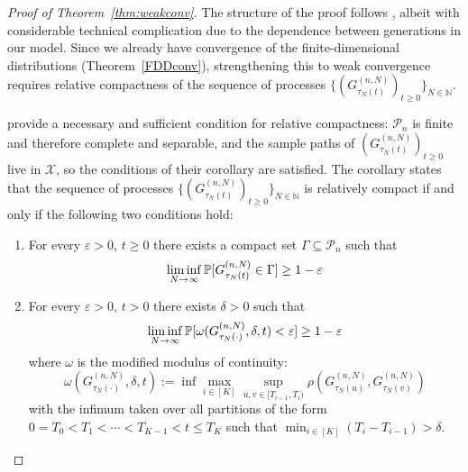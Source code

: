 \begin{proof}[Proof of Theorem~\ref{thm:weakconv}]
The structure of the proof follows \textcite{mohle1999}, albeit with considerable technical complication due to the dependence between generations in our model. 
Since we already have convergence of the finite-dimensional distributions (Theorem~\ref{FDDconv}), strengthening this to weak convergence requires relative compactness of the sequence of processes $\{ (G_{\tau_N(t)}^{(n,N)})_{t\geq0} \}_{N\in\mathbb{N}}$.

\textcite[Chapter 3, Corollary 7.4]{ethier1986} provide a necessary and sufficient condition for relative compactness: $\mathcal{P}_n$ is finite and therefore complete and separable, and the sample paths of $(G_{\tau_N(t)}^{(n,N)})_{t\geq0}$ live in $\mathcal{X}$, so the conditions of their corollary are satisfied.
The corollary states that the sequence of processes $\{ (G_{\tau_N(t)}^{(n,N)})_{t\geq0} \}_{N\in\mathbb{N}}$ is relatively compact if and only if the following two conditions hold:
\begin{enumerate}
\item \label{item:relcomp1} For every $\varepsilon>0$, $t\geq 0$ there exists a compact set $\Gamma \subseteq \mathcal{P}_n$ such that
\begin{equation*}
\liminf_{N\to\infty} \mathbb{P}[ G_{\tau_N(t)}^{(n,N)} \in \Gamma ] 
\geq 1-\varepsilon
\end{equation*}
\item \label{item:relcomp2} For every $\varepsilon>0$, $t>0$ there exists $\delta>0$ such that
\begin{equation*}
\liminf_{N\to\infty} \mathbb{P}[ \omega(G_{\tau_N(\cdot)}^{(n,N)}, \delta, t) < \varepsilon ] 
\geq 1-\varepsilon
\end{equation*}
where $\omega$ is the modified modulus of continuity:
\begin{equation*}
\omega(G_{\tau_N(\cdot)}^{(n,N)}, \delta, t) := \inf \max_{i \in [K]} 
        \sup_{u,v \in [T_{i-1}, T_i)} \rho\left( 
        G_{\tau_N(u)}^{(n,N)}, G_{\tau_N(v)}^{(n,N)} \right)
\end{equation*}
with the infimum taken over all partitions of the form $0=T_0<T_1<\cdots <T_{K-1} <t \leq T_K$ such that $\min_{i\in[K]} (T_i - T_{i-1}) > \delta$. 
\end{enumerate}

\end{proof}
